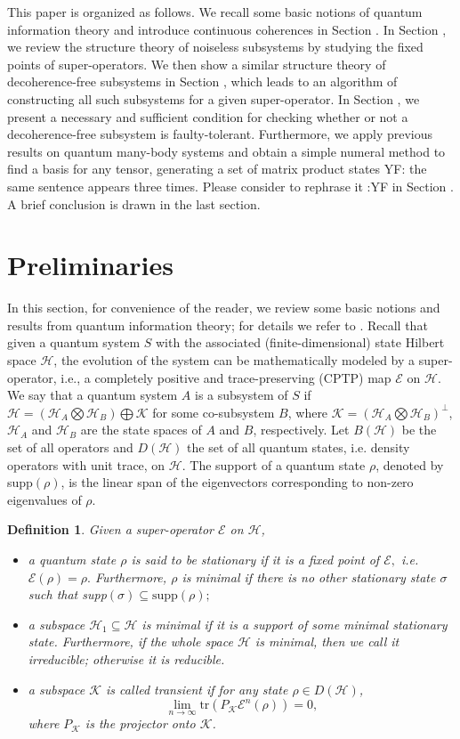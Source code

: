 \documentclass[journal]{IEEEtran}
\def\h{\ensuremath{\mathcal{H}}}
\def\k{\ensuremath{\mathcal{K}}}
\def\e{\ensuremath{\mathcal{E}}}
\def\k{\mathcal{K}}
\newtheorem{definition}{Definition}
\newcommand{\authorComment}[3]{\color{#1}#2: {#3} :#2\color{black}}
\newcommand{\yf}[1]{\authorComment{blue}{YF}{#1}}
\begin{document}
This paper is organized as follows. We recall some basic notions of quantum information theory and introduce continuous coherences in Section \uppercase\expandafter{}. In Section \uppercase\expandafter{}, we review the structure theory of noiseless subsystems by studying the fixed points of super-operators. We then show a similar structure theory of decoherence-free subsystems in Section \uppercase\expandafter{}, which leads to an algorithm of constructing all such subsystems for a given super-operator. In Section \uppercase\expandafter{}, we present a necessary and sufficient condition for checking whether or not a decoherence-free subsystem is faulty-tolerant. Furthermore, 
we apply previous results on  quantum many-body systems and obtain a simple numeral method to find a basis for any tensor, generating a set of matrix product states  \yf{the same sentence appears three times. Please consider to rephrase it}  in Section \uppercase\expandafter{}. A brief conclusion is drawn in the last section.

\section{Preliminaries}

In this section, for convenience of the reader, we review some basic notions and results from quantum information theory; for details we refer to \cite{nielsen2010quantum}. Recall that given a quantum system $S$ with the associated (finite-dimensional) state Hilbert space $\h$, the evolution of the system can be mathematically  modeled by a super-operator, i.e., a completely positive  and trace-preserving (CPTP) map $\e$ on $\h$.  We say that a quantum system $A$ is a subsystem of $S$ if $\h=(\h_A\bigotimes\h_B)\bigoplus \k$ for some co-subsystem $B$, where $\k=(\h_A\bigotimes\h_B)^\perp$, $\h_A$ and $\h_B$ are the state spaces  of $A$ and $B$, respectively.  
  Let $B(\h)$ be the set of all  operators and $D(\h)$ the set of all quantum states, i.e. density operators with unit trace, on $\h$.  The support of a quantum state $\rho$, denoted by supp$(\rho)$, is the linear span of the eigenvectors corresponding to non-zero eigenvalues of $\rho.$ 
\begin{definition}
  Given a super-operator $\e$ on $\h$, 
  \begin{itemize}
    \item[(1)] a quantum state  $\rho$ is said to be stationary if it is a fixed point of $\e,$ i.e. $\e(\rho)=\rho.$ Furthermore, $\rho$ is minimal if there is no other stationary state $\sigma$ such that supp$(\sigma)\subseteq \textrm{supp}(\rho);$
    \item[(2)] a subspace $\h_1\subseteq \h$ is minimal if it is a support of some minimal stationary state. Furthermore, if the whole space $\h$ is minimal, then we call it irreducible; otherwise it is reducible.
    \item[(3)] a subspace $\k$ is called transient if for any state $\rho\in D(\h)$, $$\lim_{n\rightarrow \infty}\textrm{tr}(P_\k\e^n(\rho))=0,$$ where $P_\k$ is the projector onto $\k$. 
  \end{itemize} 
\end{definition}
\end{document}
